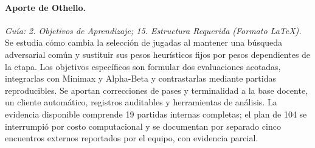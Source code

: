\paragraph{Aporte de Othello.}
\textit{Guía: 2. Objetivos de Aprendizaje; 15. Estructura Requerida (Formato \LaTeX).}
Se estudia cómo cambia la selección de jugadas al mantener una búsqueda adversarial común y sustituir sus pesos heurísticos fijos por pesos dependientes de la etapa. Los objetivos específicos son formular dos evaluaciones acotadas, integrarlas con Minimax y Alpha-Beta y contrastarlas mediante partidas reproducibles. Se aportan correcciones de pases y terminalidad a la base docente, un cliente automático, registros auditables y herramientas de análisis. La evidencia disponible comprende 19 partidas internas completas; el plan de 104 se interrumpió por costo computacional y se documentan por separado cinco encuentros externos reportados por el equipo, con evidencia parcial.
